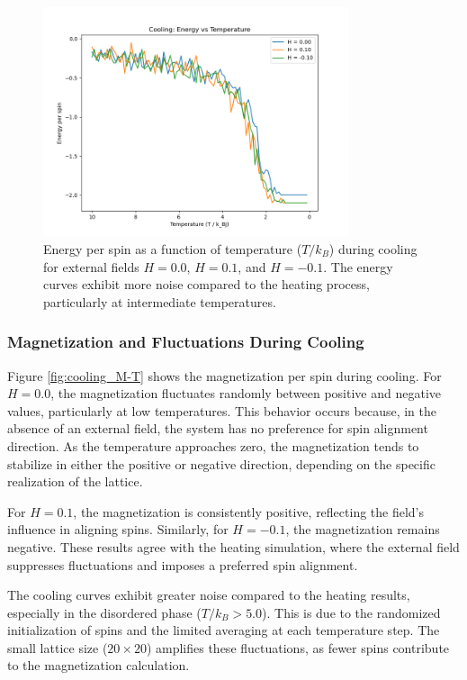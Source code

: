 \documentclass[11pt]{article}
\begin{document}
\begin{figure}[h!]
\centering
\includegraphics[width=0.8\textwidth]{Figs_Salar/cooling E-T (S).png}
\caption{Energy per spin as a function of temperature (\(T / k_B\)) during cooling for external fields \(H = 0.0\), \(H = 0.1\), and \(H = -0.1\). The energy curves exhibit more noise compared to the heating process, particularly at intermediate temperatures.}
\label{fig:cooling_E-T}
\end{figure}

\subsubsection*{Magnetization and Fluctuations During Cooling}
Figure \ref{fig:cooling_M-T} shows the magnetization per spin during cooling. For \(H = 0.0\), the magnetization fluctuates randomly between positive and negative values, particularly at low temperatures. This behavior occurs because, in the absence of an external field, the system has no preference for spin alignment direction. As the temperature approaches zero, the magnetization tends to stabilize in either the positive or negative direction, depending on the specific realization of the lattice.

For \(H = 0.1\), the magnetization is consistently positive, reflecting the field's influence in aligning spins. Similarly, for \(H = -0.1\), the magnetization remains negative. These results agree with the heating simulation, where the external field suppresses fluctuations and imposes a preferred spin alignment.

The cooling curves exhibit greater noise compared to the heating results, especially in the disordered phase (\(T / k_B > 5.0\)). This is due to the randomized initialization of spins and the limited averaging at each temperature step. The small lattice size (\(20 \times 20\)) amplifies these fluctuations, as fewer spins contribute to the magnetization calculation.
\end{document}
